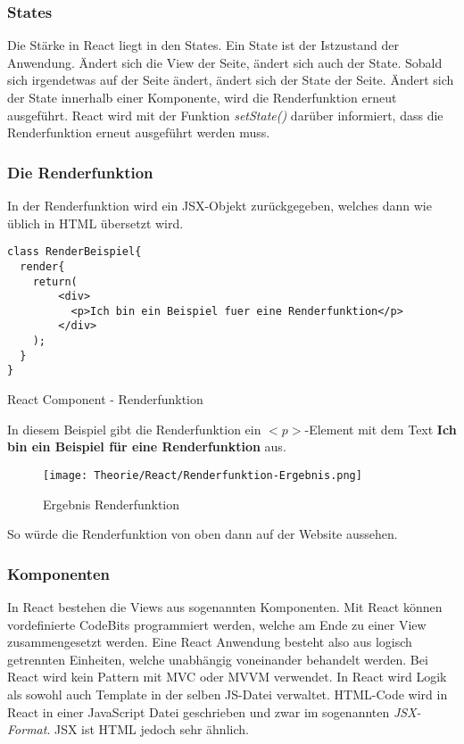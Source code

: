 \subsubsection{States}
Die Stärke in React liegt in den States. Ein State ist der Istzustand der Anwendung. Ändert sich 
die View der Seite, ändert sich auch der State. Sobald sich irgendetwas auf der Seite ändert, 
ändert sich der State der Seite. Ändert sich der State innerhalb einer Komponente, wird die 
Renderfunktion erneut ausgeführt. React wird mit der Funktion \textit{setState()} darüber informiert,
dass die Renderfunktion erneut ausgeführt werden muss.\pagebreak

\subsubsection{Die Renderfunktion}
In der Renderfunktion wird ein JSX-Objekt zurückgegeben, welches dann wie üblich in HTML
übersetzt wird. 

\begin{code}[htp]
\begin{lstlisting}
class RenderBeispiel{
  render{
    return(
        <div>
          <p>Ich bin ein Beispiel fuer eine Renderfunktion</p>
        </div>
    );
  }
}
\end{lstlisting}
\caption{React Component - Renderfunktion}
\end{code}

In diesem Beispiel gibt die Renderfunktion ein $<p>$-Element mit dem Text \textbf{Ich bin ein 
Beispiel für eine Renderfunktion} aus.

\begin{figure}[H]
  \begin{center}
    \texttt{[image: Theorie/React/Renderfunktion-Ergebnis.png]}
    \caption{Ergebnis Renderfunktion}
  \end{center}
\end{figure}

So würde die Renderfunktion von oben dann auf der Website aussehen.

\newpage
\subsubsection{Komponenten}
In React bestehen die Views aus sogenannten Komponenten. Mit React können vordefinierte CodeBits 
programmiert werden, welche am Ende zu einer View zusammengesetzt werden. Eine React Anwendung 
besteht also aus logisch getrennten Einheiten, welche unabhängig voneinander behandelt werden.
Bei React wird kein Pattern mit MVC oder MVVM verwendet. In React wird Logik als 
sowohl auch Template in der selben JS-Datei verwaltet.
HTML-Code wird in React in einer JavaScript Datei geschrieben und zwar im sogenannten \textit{JSX-Format}. 
JSX ist HTML jedoch sehr ähnlich.\cite{Komp}


